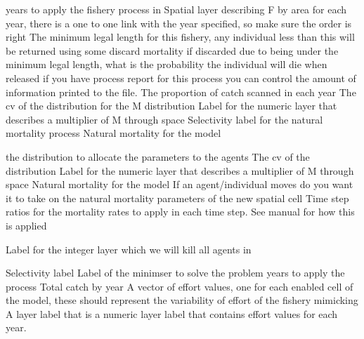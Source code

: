  {years to apply the fishery process in}
 {Spatial layer describing F by area for each year, there is a one to one link with the year specified, so make sure the order is right}
 {The minimum legal length for this fishery, any individual less than this will be returned using some discard mortality}
 {if discarded due to being under the minimum legal length, what is the probability the individual will die when released}
 {if you have process report for this process you can control the amount of information printed to the file.}
 {The proportion of catch scanned in each year}
 {The cv of the distribution for the M distribution}
 {Label for the numeric layer that describes a multiplier of M through space}
 {Selectivity label for the natural mortality process}
 {Natural mortality for the model}
\par\textbf{}\par
{} {the distribution to allocate the parameters to the agents}
 {The cv of the distribution}
 {Label for the numeric layer that describes a multiplier of M through space}
 {Natural mortality for the model}
 {If an agent/individual moves do you want it to take on the natural mortality parameters of the new spatial cell}
 {Time step ratios for the mortality rates to apply in each time step. See manual for how this is applied}
 {}
\par\textbf{}\par
{} {Label for the integer layer which we will kill all agents in}
\par\textbf{}\par
{} {Selectivity label}
 {Label of the minimser to solve the problem}
 {years to apply the process}
 {Total catch by year}
 {A vector of effort values, one for each enabled cell of the model, these should represent the variability of effort of the fishery mimicking}
 {A layer label that is a numeric layer label that contains effort values for each year.}
